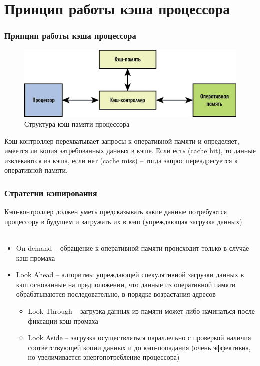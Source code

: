\documentclass{beamer}
\begin{document}
\section{Принцип работы кэша процессора}

\begin{frame}
\frametitle{Принцип работы кэша процессора}

\begin{figure}
\includegraphics[scale=0.65]{Pic_1}
\caption{Структура кэш-памяти процессора}
\end{figure}

Кэш-контроллер перехватывает запросы к оперативной памяти и определяет, имеется ли копия затребованных данных в кэше. Если есть (cache hit), то данные извлекаются из кэша, если нет (cache miss) -- тогда запрос переадресуется к оперативной памяти.

\end{frame}


\begin{frame}
\frametitle{Стратегии кэширования}

Кэш-контроллер должен уметь предсказывать какие данные потребуются процессору в будущем и загружать их в кэш (упреждающая загрузка данных)\\~\\

\begin{itemize}
\item On demand -- обращение к оперативной памяти происходит только в случае кэш-промаха
\item Look Ahead -- алгоритмы упреждающей спекулятивной загрузки данных в кэш основанные на предположении, что данные из оперативной памяти обрабатываются последовательно, в порядке возрастания адресов
\begin{itemize}
\item Look Through -- загрузка данных из памяти может либо начинаться после фиксации кэш-промаха
\item Look Aside -- загрузка осуществляться параллельно с проверкой наличия соответствующей копии данных и до кэш-попадания (очень эффективна, но увеличивается энергопотребление процессора)
\end{itemize}
\end{itemize}

\end{frame}
\end{document}
